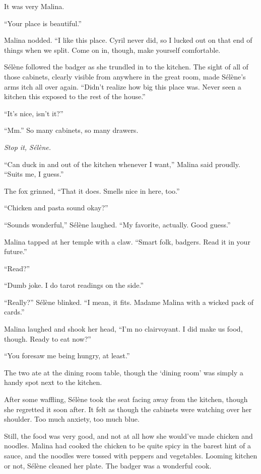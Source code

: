 It was very Malina.

``Your place is beautiful.''

Malina nodded. ``I like this place. Cyril never did, so I lucked out on that end of things when we split. Come on in, though, make yourself comfortable.

Sélène followed the badger as she trundled in to the kitchen. The sight of all of those cabinets, clearly visible from anywhere in the great room, made Sélène's arms itch all over again. ``Didn't realize how big this place was. Never seen a kitchen this exposed to the rest of the house.''

``It's nice, isn't it?''

``Mm.'' So many cabinets, so many drawers.

\emph{Stop it, Sélène.}

``Can duck in and out of the kitchen whenever I want,'' Malina said proudly. ``Suits me, I guess.''

The fox grinned, ``That it does. Smells nice in here, too.''

``Chicken and pasta sound okay?''

``Sounds wonderful,'' Sélène laughed. ``My favorite, actually. Good guess.''

Malina tapped at her temple with a claw. ``Smart folk, badgers. Read it in your future.''

``Read?''

``Dumb joke. I do tarot readings on the side.''

``Really?'' Sélène blinked. ``I mean, it fits. Madame Malina with a wicked pack of cards.''

Malina laughed and shook her head, ``I'm no clairvoyant. I did make us food, though. Ready to eat now?''

``You foresaw me being hungry, at least.''

The two ate at the dining room table, though the `dining room' was simply a handy spot next to the kitchen.

After some waffling, Sélène took the seat facing away from the kitchen, though she regretted it soon after. It felt as though the cabinets were watching over her shoulder. Too much anxiety, too much blue.

Still, the food was very good, and not at all how she would've made chicken and noodles. Malina had cooked the chicken to be quite spicy in the barest hint of a sauce, and the noodles were tossed with peppers and vegetables. Looming kitchen or not, Sélène cleaned her plate. The badger was a wonderful cook.

